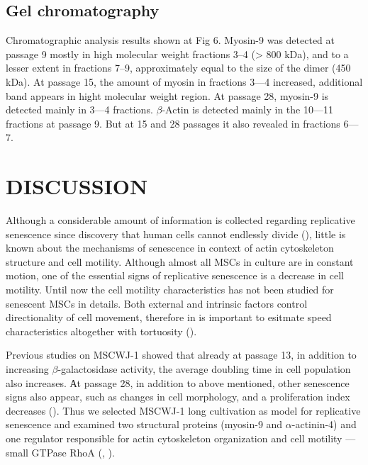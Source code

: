 \documentclass[alpha-refs]{wiley-article}
\begin{document}
\subsection{Gel chromatography}

Chromatographic analysis results shown at Fig 6.
Myosin-9 was detected at passage 9 mostly in high molecular weight fractions 3--4 (> 800 kDa), and to a lesser extent in fractions 7--9, approximately equal to the size of the dimer (450 kDa).
At passage 15, the amount of myosin in fractions 3–--4 increased, additional band appears in hight molecular weight region.
At passage 28, myosin-9 is detected mainly in 3---4 fractions.
$\beta$-Actin is detected mainly in the 10---11 fractions at passage 9.
But at 15 and 28 passages it also revealed in fractions 6---7.

\section{DISCUSSION}

Although a considerable amount of information is collected regarding replicative senescence since discovery that human cells cannot endlessly divide (\cite{hayflick1961serial}), little is known about the mechanisms of senescence in context of actin cytoskeleton structure and cell motility.
Although almost all MSCs in culture are in constant motion, one of the essential signs of replicative senescence is a decrease in cell motility.
Until now the cell motility characteristics has not been studied for senescent MSCs in details.
Both external and intrinsic factors control directionality of cell movement, therefore in is important to esitmate speed characteristics altogether with tortuosity (\cite{tiurin2013molecular}).

Previous studies on MSCWJ-1 showed that already at passage 13, in addition to increasing $\beta$-galactosidase activity, the average doubling time in cell population also increases.
Аt passage 28, in addition to above mentioned, other senescence signs also appear, such as changes in cell morphology, and a proliferation index decreases (\cite{koltsova2018dynamics}). Thus we selected MSCWJ-1  long cultivation as model for replicative senescence and examined two structural proteins (myosin-9 and $\alpha$-actinin-4) and one regulator responsible for actin cytoskeleton organization and cell motility --- small GTPase RhoA (\cite{wang2003regulation}, \cite{elliott2015myosin}).
\end{document}
